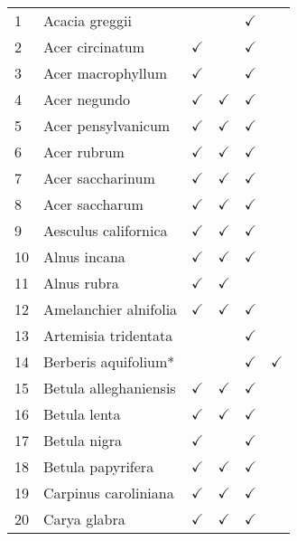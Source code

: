 \begin{table}
\begin{tabularx}{\textwidth}{p{0.5cm}XXXXX}
1 & Acacia greggii &  &  & $\checkmark$ &  \\ 
2 & Acer circinatum & $\checkmark$ &  & $\checkmark$ &  \\ 
3 & Acer macrophyllum & $\checkmark$ &  & $\checkmark$ &  \\ 
4 & Acer negundo & $\checkmark$ & $\checkmark$ & $\checkmark$ &  \\ 
5 & Acer pensylvanicum & $\checkmark$ & $\checkmark$ & $\checkmark$ &  \\ 
6 & Acer rubrum & $\checkmark$ & $\checkmark$ & $\checkmark$ &  \\ 
7 & Acer saccharinum & $\checkmark$ & $\checkmark$ & $\checkmark$ &  \\ 
8 & Acer saccharum & $\checkmark$ & $\checkmark$ & $\checkmark$ &  \\ 
9 & Aesculus californica & $\checkmark$ & $\checkmark$ & $\checkmark$ &  \\ 
10 & Alnus incana & $\checkmark$ & $\checkmark$ & $\checkmark$ &  \\ 
11 & Alnus rubra & $\checkmark$ & $\checkmark$ &  &  \\ 
12 & Amelanchier alnifolia & $\checkmark$ & $\checkmark$ & $\checkmark$ &  \\ 
13 & Artemisia tridentata &  &  & $\checkmark$ &  \\ 
14 & Berberis aquifolium* &  &  & $\checkmark$ & $\checkmark$ \\ 
15 & Betula alleghaniensis & $\checkmark$ & $\checkmark$ & $\checkmark$ &  \\ 
16 & Betula lenta & $\checkmark$ & $\checkmark$ & $\checkmark$ &  \\ 
17 & Betula nigra & $\checkmark$ &  & $\checkmark$ &  \\ 
18 & Betula papyrifera & $\checkmark$ & $\checkmark$ & $\checkmark$ &  \\ 
19 & Carpinus caroliniana & $\checkmark$ & $\checkmark$ & $\checkmark$ &  \\ 
20 & Carya glabra & $\checkmark$ & $\checkmark$ & $\checkmark$ &  \\ 

\hline
\end{tabularx}
\end{table}


